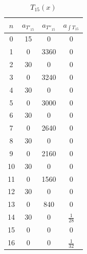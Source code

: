 \documentclass[11pt]{article} %
\begin{document}
{{\begin{table}[H]
\begin{minipage}{.5\linewidth}
\centering
\caption*{$T_{15}(x)$}
\begin{tabular}{| c | c | c | c |}
\hline 
$n$ & $a_{T'_{15}}$ & $a_{T''_{15}}$ & $a_{\int T_{15}}$ \\
\hline \hline
0 & 15 & 0 & 0\\
1 & 0 & 3360 & 0\\
2 & 30& 0 & 0\\
3 & 0& 3240& 0\\
4 & 30 & 0& 0\\
5 & 0 & 3000 & 0\\
6 & 30 & 0 & 0\\
7 & 0 & 2640 & 0\\
8 & 30 & 0 & 0\\
9 & 0 & 2160 & 0\\
10 & 30 & 0 & 0\\
11 &  0& 1560 & 0\\
12 &  30& 0& 0\\
13 &  0& 840& 0\\
14 &  30& 0& $\frac{1}{28}$\\
15 &  0& 0& 0\\
16 &  0& 0& $\frac{1}{32}$\\
\hline
\end{tabular}
\end{minipage}
\end{table}
\begin{table}[H]

\end{table}}}
\end{document}
